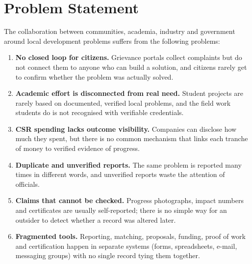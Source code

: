 \section{Problem Statement}
The collaboration between communities, academia, industry and government around local development problems suffers from the following problems:
\begin{enumerate}
  \item \textbf{No closed loop for citizens.} Grievance portals collect complaints but do not connect them to anyone who can build a solution, and citizens rarely get to confirm whether the problem was actually solved.
  \item \textbf{Academic effort is disconnected from real need.} Student projects are rarely based on documented, verified local problems, and the field work students do is not recognised with verifiable credentials.
  \item \textbf{CSR spending lacks outcome visibility.} Companies can disclose how much they spent, but there is no common mechanism that links each tranche of money to verified evidence of progress.
  \item \textbf{Duplicate and unverified reports.} The same problem is reported many times in different words, and unverified reports waste the attention of officials.
  \item \textbf{Claims that cannot be checked.} Progress photographs, impact numbers and certificates are usually self-reported; there is no simple way for an outsider to detect whether a record was altered later.
  \item \textbf{Fragmented tools.} Reporting, matching, proposals, funding, proof of work and certification happen in separate systems (forms, spreadsheets, e-mail, messaging groups) with no single record tying them together.
\end{enumerate}

